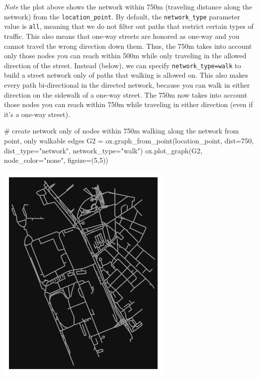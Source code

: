 \documentclass[
  letterpaper,
  DIV=11,
  numbers=noendperiod]{scrreprt}
\newenvironment{Shaded}{\begin{snugshade}}{\end{snugshade}}
\newcommand{\CommentTok}[1]{\textcolor[rgb]{0.37,0.37,0.37}{#1}}
\newcommand{\DecValTok}[1]{\textcolor[rgb]{0.68,0.00,0.00}{#1}}
\newcommand{\NormalTok}[1]{\textcolor[rgb]{0.00,0.23,0.31}{#1}}
\newcommand{\OperatorTok}[1]{\textcolor[rgb]{0.37,0.37,0.37}{#1}}
\newcommand{\StringTok}[1]{\textcolor[rgb]{0.13,0.47,0.30}{#1}}
\begin{document}
\emph{Note} the plot above shows the network within 750m (traveling
distance along the network) from the \texttt{location\_point}. By
default, the \texttt{network\_type} parameter value is \texttt{all},
meaning that we do not filter out paths that restrict certain types of
traffic. This also means that one-way streets are honored as one-way and
you cannot travel the wrong direction down them. Thus, the 750m takes
into account only those nodes you can reach within 500m while only
traveling in the allowed direction of the street. Instead (below), we
can specify
\texttt{network\_type=\textquotesingle{}walk\textquotesingle{}} to build
a street network only of paths that walking is allowed on. This also
makes every path bi-directional in the directed network, because you can
walk in either direction on the sidewalk of a one-way street. The 750m
now takes into account those nodes you can reach within 750m while
traveling in either direction (even if it's a one-way street).

\begin{Shaded}
\begin{Highlighting}[]
\CommentTok{\# create network only of nodes within 750m walking along the network from point, only walkable edges}
\NormalTok{G2 }\OperatorTok{=}\NormalTok{ ox.graph\_from\_point(location\_point, dist}\OperatorTok{=}\DecValTok{750}\NormalTok{, dist\_type}\OperatorTok{=}\StringTok{"network"}\NormalTok{, network\_type}\OperatorTok{=}\StringTok{"walk"}\NormalTok{)}
\NormalTok{ox.plot\_graph(G2, node\_color}\OperatorTok{=}\StringTok{"none"}\NormalTok{, figsize}\OperatorTok{=}\NormalTok{(}\DecValTok{5}\NormalTok{,}\DecValTok{5}\NormalTok{))}
\end{Highlighting}
\end{Shaded}

\includegraphics{labs/w07_OSM_files/figure-pdf/cell-9-output-1.png}
\end{document}
